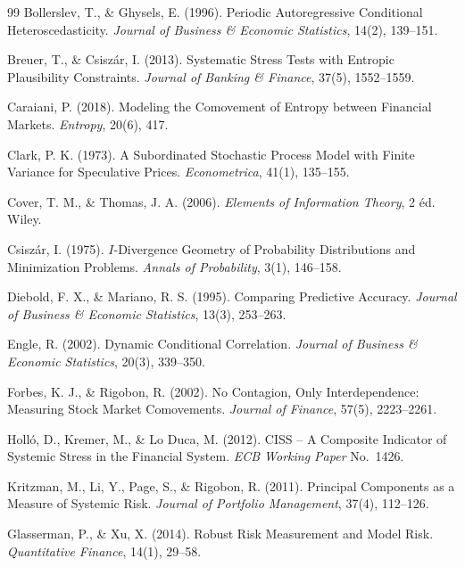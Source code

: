 \documentclass[11pt]{article}
\theoremstyle{definition}
\theoremstyle{remark}
\begin{document}
\begin{thebibliography}{99}
 Bollerslev, T., \& Ghysels, E. (1996). Periodic Autoregressive Conditional Heteroscedasticity. \textit{Journal of Business \& Economic Statistics}, 14(2), 139--151.

 Breuer, T., \& Csiszár, I. (2013). Systematic Stress Tests with Entropic Plausibility Constraints. \textit{Journal of Banking \& Finance}, 37(5), 1552--1559.

 Caraiani, P. (2018). Modeling the Comovement of Entropy between Financial Markets. \textit{Entropy}, 20(6), 417.

 Clark, P. K. (1973). A Subordinated Stochastic Process Model with Finite Variance for Speculative Prices. \textit{Econometrica}, 41(1), 135--155.

 Cover, T. M., \& Thomas, J. A. (2006). \textit{Elements of Information Theory}, 2\ieme{} éd. Wiley.

 Csiszár, I. (1975). $I$-Divergence Geometry of Probability Distributions and Minimization Problems. \textit{Annals of Probability}, 3(1), 146--158.

 Diebold, F. X., \& Mariano, R. S. (1995). Comparing Predictive Accuracy. \textit{Journal of Business \& Economic Statistics}, 13(3), 253--263.

 Engle, R. (2002). Dynamic Conditional Correlation. \textit{Journal of Business \& Economic Statistics}, 20(3), 339--350.

 Forbes, K. J., \& Rigobon, R. (2002). No Contagion, Only Interdependence: Measuring Stock Market Comovements. \textit{Journal of Finance}, 57(5), 2223--2261.

 Holló, D., Kremer, M., \& Lo Duca, M. (2012). CISS -- A Composite Indicator of Systemic Stress in the Financial System. \textit{ECB Working Paper} No.~1426.

 Kritzman, M., Li, Y., Page, S., \& Rigobon, R. (2011). Principal Components as a Measure of Systemic Risk. \textit{Journal of Portfolio Management}, 37(4), 112--126.

 Glasserman, P., \& Xu, X. (2014). Robust Risk Measurement and Model Risk. \textit{Quantitative Finance}, 14(1), 29--58.


\end{thebibliography}
\end{document}
